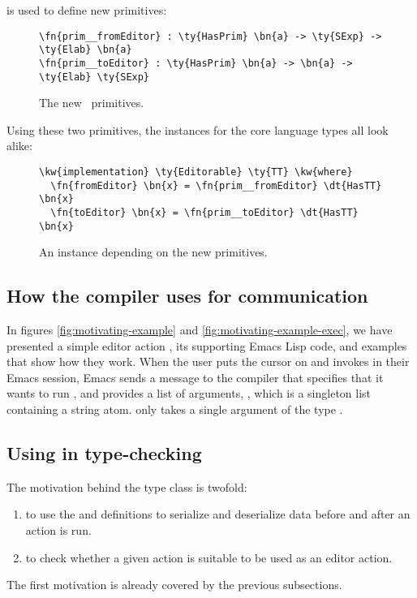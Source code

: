  is used to define new \Elab{} primitives:

\begin{figure}[H]
\begin{Verbatim}
\fn{prim__fromEditor} : \ty{HasPrim} \bn{a} -> \ty{SExp} -> \ty{Elab} \bn{a}
\fn{prim__toEditor} : \ty{HasPrim} \bn{a} -> \bn{a} -> \ty{Elab} \ty{SExp}
\end{Verbatim}
  \caption{The new \Elab\ primitives.}
\label{code:newElabPrims}
\end{figure}

Using these two primitives, the \Editorable{} instances for the core language
types all look alike:

\begin{figure}[H]
\begin{Verbatim}
\kw{implementation} \ty{Editorable} \ty{TT} \kw{where}
  \fn{fromEditor} \bn{x} = \fn{prim__fromEditor} \dt{HasTT} \bn{x}
  \fn{toEditor} \bn{x} = \fn{prim__toEditor} \dt{HasTT} \bn{x}
\end{Verbatim}
  \caption{An \Editorable{} instance depending on the new primitives.}
\end{figure}

\subsection{How the compiler uses \Editorable{} for communication}
\label{ssec:communication}

In figures \ref{fig:motivating-example} and \ref{fig:motivating-example-exec},
we have presented a simple editor action , its supporting Emacs Lisp code,
and examples that show how they work. When the user puts the cursor on
 and invokes  in their Emacs session, Emacs sends a message to the compiler that specifies that it wants to run , and provides a list of arguments, , which is a singleton list containing a string atom.
 only takes a single argument of the type . 


\subsection{Using \Editorable{} in type-checking}
\label{ssec:typechecking}

The motivation behind the  type class is twofold:
\begin{enumerate}
\item to use the  and  definitions to serialize
  and deserialize data before and after an \Elab{} action is run.
\item to check whether a given \Elab{} action is suitable to be used as an
  editor action.
\end{enumerate}

The first motivation is already covered by the previous subsections.
